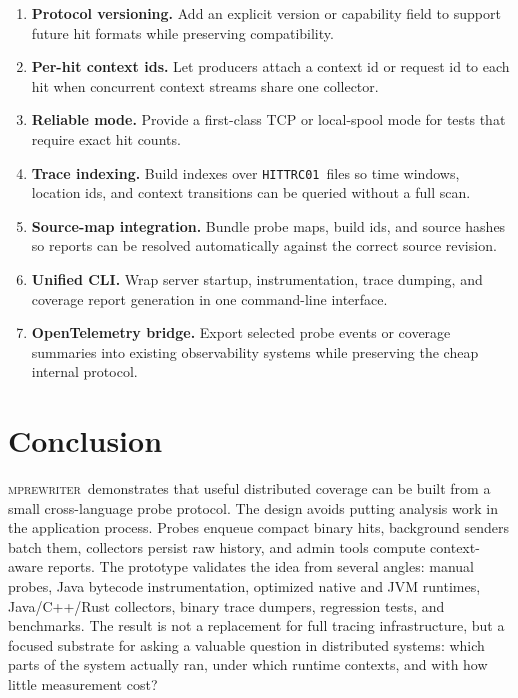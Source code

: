 \documentclass[11pt]{article}
\newcommand{\tool}{\textsc{mprewriter}}
\newcommand{\hittrace}{\texttt{HITTRC01}}
\begin{document}
\begin{enumerate}
  \item \textbf{Protocol versioning.} Add an explicit version or capability
  field to support future hit formats while preserving compatibility.

  \item \textbf{Per-hit context ids.} Let producers attach a context id or
  request id to each hit when concurrent context streams share one collector.

  \item \textbf{Reliable mode.} Provide a first-class TCP or local-spool mode
  for tests that require exact hit counts.

  \item \textbf{Trace indexing.} Build indexes over \hittrace\ files so time
  windows, location ids, and context transitions can be queried without a full
  scan.

  \item \textbf{Source-map integration.} Bundle probe maps, build ids, and
  source hashes so reports can be resolved automatically against the correct
  source revision.

  \item \textbf{Unified CLI.} Wrap server startup, instrumentation, trace
  dumping, and coverage report generation in one command-line interface.

  \item \textbf{OpenTelemetry bridge.} Export selected probe events or coverage
  summaries into existing observability systems while preserving the cheap
  internal protocol.
\end{enumerate}

\section{Conclusion}

\tool\ demonstrates that useful distributed coverage can be built from a small
cross-language probe protocol. The design avoids putting analysis work in the
application process. Probes enqueue compact binary hits, background senders
batch them, collectors persist raw history, and admin tools compute
context-aware reports. The prototype validates the idea from several angles:
manual probes, Java bytecode instrumentation, optimized native and JVM
runtimes, Java/C++/Rust collectors, binary trace dumpers, regression tests, and
benchmarks. The result is not a replacement for full tracing infrastructure,
but a focused substrate for asking a valuable question in distributed systems:
which parts of the system actually ran, under which runtime contexts, and with
how little measurement cost?
\end{document}
